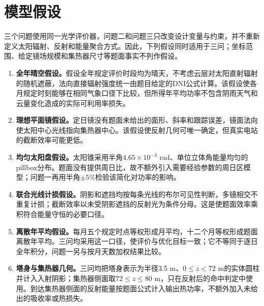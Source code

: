\section{模型假设}
三个问题使用同一光学评价器，问题二和问题三只改变设计变量与约束，并不重新定义太阳辐射、反射和能量聚合方式。因此，下列假设同时适用于三问；坐标范围、给定镜场规模和集热器尺寸等题面事实不列作假设。

\begin{enumerate}[itemindent=2em]
  \item \textbf{全年晴空假设。}假设全年规定评价时段均为晴天，不考虑云层对太阳直射辐射的随机遮蔽，法向直接辐射强度统一由题目给定的DNI公式计算。该假设使各月规定时刻能够在相同气象口径下比较，但所得年平均功率不包含阴雨天气和云量变化造成的实际可利用率损失。
  \item \textbf{理想平面镜假设。}定日镜没有题面未给出的面形、斜率和跟踪误差，镜面法向使太阳中心光线指向集热器中心。该假设使反射几何可唯一确定，但真实电站的截断效率可能更低。
  \item \textbf{均匀太阳盘假设。}太阳锥采用半角$4.65\times10^{-3}$ rad、单位立体角能量均匀的pillbox分布。题面没有提供周日比，故不额外引入需要经验参数的周日区模型；问题一再用半角$\pm5\%$检验该简化对功率的影响。
  \item \textbf{联合光线计损假设。}阴影和遮挡均按每条光线的布尔可见性判断，多镜相交不重复计损；截断效率以未受阴影遮挡的反射光为条件分母。这是使题面效率乘积符合能量守恒的必要口径。
  \item \textbf{离散年平均假设。}每月五个规定时点等权形成月平均，十二个月等权形成题面离散年平均。三问均采用这一口径，使评价与优化目标一致；它不等同于逐日全年积分，问题一另与按月天数加权结果比较。
  \item \textbf{塔身与集热器几何。}三问均把塔身表示为半径3.5 m、$0\le z<72$ m的实体圆柱并计入入射阴影；集热器侧面取$72\le z\le80$ m，只在反射后的命中判定中使用。到达集热器侧面的反射能量按题面公式计入输出热功率，不额外加入未给出的吸收率或热损失。
\end{enumerate}
